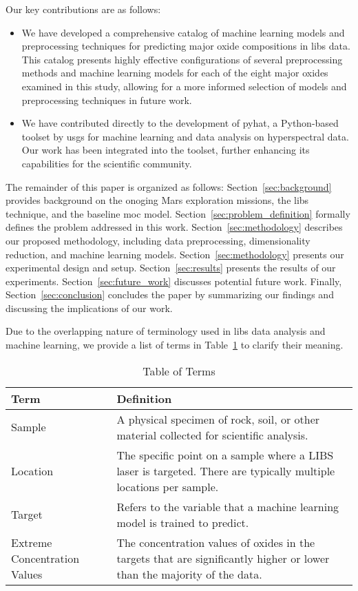 Our key contributions are as follows:
\begin{itemize}
    \item We have developed a comprehensive catalog of machine learning models and preprocessing techniques for predicting major oxide compositions in \gls{libs} data. This catalog presents highly effective configurations of several preprocessing methods and machine learning models for each of the eight major oxides examined in this study, allowing for a more informed selection of models and preprocessing techniques in future work.
    \item We have contributed directly to the development of \gls{pyhat}, a Python-based toolset by \gls{usgs} for machine learning and data analysis on hyperspectral data. Our work has been integrated into the toolset, further enhancing its capabilities for the scientific community.
\end{itemize}


The remainder of this paper is organized as follows:
Section~\ref{sec:background} provides background on the onoging Mars exploration missions, the \gls{libs} technique, and the baseline \gls{moc} model.
Section~\ref{sec:problem_definition} formally defines the problem addressed in this work.
Section~\ref{sec:methodology} describes our proposed methodology, including data preprocessing, dimensionality reduction, and machine learning models.
Section~\ref{sec:methodology} presents our experimental design and setup.
Section~\ref{sec:results} presents the results of our experiments.
Section~\ref{sec:future_work} discusses potential future work.
Finally, Section~\ref{sec:conclusion} concludes the paper by summarizing our findings and discussing the implications of our work.

Due to the overlapping nature of terminology used in \gls{libs} data analysis and machine learning, we provide a list of terms in Table~\ref{tab:terms} to clarify their meaning.

\begin{table}
\centering
\begin{tabularx}{\columnwidth}{lX} %
\toprule
Term & Definition \\
\midrule
Sample & A physical specimen of rock, soil, or other material collected for scientific analysis.\\
Location & The specific point on a sample where a LIBS laser is targeted. There are typically multiple locations per sample. \\
Target & Refers to the variable that a machine learning model is trained to predict. \\
Extreme Concentration Values & The concentration values of oxides in the targets that are significantly higher or lower than the majority of the data. \\
\bottomrule
\end{tabularx}
\caption{Table of Terms}
\label{tab:terms}
\end{table}